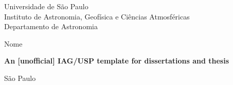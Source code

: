 
\thispagestyle{empty}%
\begin{center}
  \Large{
    Universidade de São Paulo \\
    Instituto de Astronomia, Geofísica e Ciências Atmosféricas \\
    Departamento de Astronomia
  }
  
  \vspace*{3cm}

  \LARGE{Nome}

  \vspace{3cm}

  \begin{center}
    \begin{huge}
      \textbf{An [unofficial] IAG/USP template for dissertations and thesis}
    \end{huge}
  \end{center}

  \vfill

  \Large{
    São Paulo \\
    \the\year\\
  }
\end{center}

\newpage
\shipout\null %








